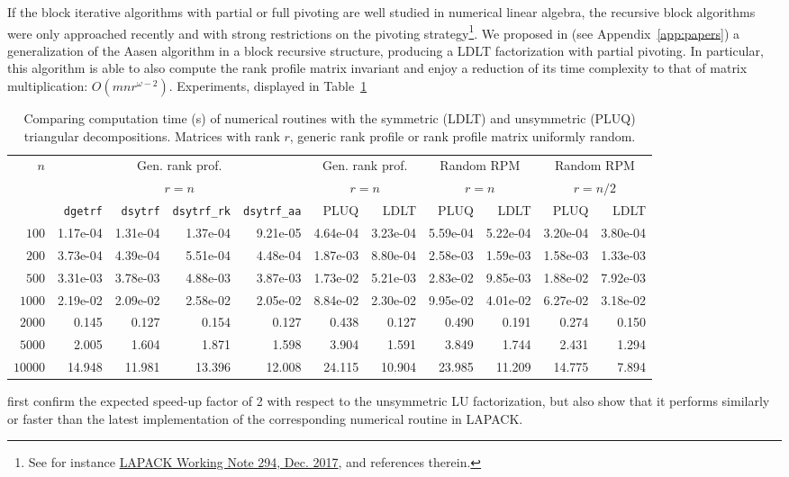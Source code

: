 \documentclass{deliverablereport}
\begin{document}
If the block iterative algorithms with partial or full pivoting are well studied
in numerical linear algebra, the recursive block algorithms were only
approached recently and with strong restrictions on the pivoting
strategy\footnote{See for instance 
\href{http://www.netlib.org/lapack/lawnspdf/lawn294.pdf}{LAPACK
  Working Note 294, Dec. 2017}, and references therein.}.
We proposed in \cite{DuPe18} (see Appendix~\ref{app:papers}) a generalization of the Aasen algorithm in a block
recursive structure, producing a LDLT factorization with partial pivoting. In
particular, this algorithm is able to also compute the rank profile matrix
invariant and enjoy a reduction of its time complexity to that of matrix
multiplication: $O(mnr^{\omega-2})$. Experiments, displayed in
Table~\ref{tab:ldlt}
%
\begin{table}[htb]\centering
  \footnotesize
    \begin{tabular}{rrrrrrrrrrr}
  \toprule
  \multirow{3}{*}{$n$} & 
  \multicolumn{4}{c}{Gen. rank prof.} & \multicolumn{2}{c}{Gen. rank prof.} &
  \multicolumn{2}{c}{Random RPM} & \multicolumn{2}{c}{Random RPM}\\
  &\multicolumn{4}{c}{ $r=n$}&\multicolumn{2}{c}{ $r=n$}&
  \multicolumn{2}{c}{ $r=n$}&\multicolumn{2}{c}{ $r=n/2$}\\
  & \texttt{dgetrf} & \texttt{dsytrf} & \texttt{dsytrf\_rk} & \texttt{dsytrf\_aa} & PLUQ & LDLT & PLUQ& LDLT & PLUQ & LDLT\\
  \midrule
$100$   & 1.17e-04 & 1.31e-04 & 1.37e-04 & 9.21e-05 & 4.64e-04 & 3.23e-04 & 5.59e-04 & 5.22e-04 & 3.20e-04 & 3.80e-04\\
$200$   & 3.73e-04 & 4.39e-04 & 5.51e-04 & 4.48e-04 & 1.87e-03 & 8.80e-04 & 2.58e-03 & 1.59e-03 & 1.58e-03 & 1.33e-03\\
$500$   & 3.31e-03 & 3.78e-03 & 4.88e-03 & 3.87e-03 & 1.73e-02 & 5.21e-03 & 2.83e-02 & 9.85e-03 & 1.88e-02 & 7.92e-03\\
$1000$  & 2.19e-02 & 2.09e-02 & 2.58e-02 & 2.05e-02 & 8.84e-02 & 2.30e-02 & 9.95e-02 & 4.01e-02 & 6.27e-02 & 3.18e-02\\
$2000$  & 0.145 & 0.127 & 0.154 & 0.127 & 0.438 & 0.127 & 0.490 & 0.191 & 0.274 & 0.150\\
$5000$  & 2.005 & 1.604 & 1.871 & 1.598 & 3.904 & 1.591 & 3.849 & 1.744 & 2.431 & 1.294\\
$10000$ & 14.948 & 11.981 & 13.396 & 12.008 & 24.115 & 10.904 & 23.985 & 11.209 & 14.775 & 7.894\\
  \bottomrule 
  \end{tabular}
  \caption{Comparing computation time (s) of numerical routines with the
    symmetric (LDLT) and unsymmetric (PLUQ) triangular decompositions. Matrices
    with rank $r$, generic rank profile or rank profile matrix uniformly
    random. }  
\label{tab:ldlt}
 \end{table}
%
first confirm the expected speed-up factor of 2 with respect
to the unsymmetric LU factorization, but also show that it performs similarly or
faster than the latest implementation of the corresponding numerical routine in LAPACK.
\end{document}
